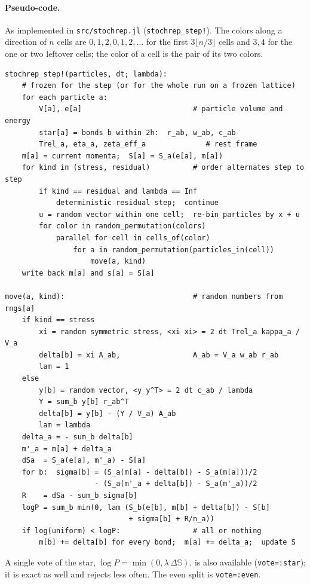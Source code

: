\documentclass[11pt,aps,preprint,nofootinbib,superscriptaddress,tightenlines]{revtex4-2}
\let\oldparagraph\paragraph
\renewcommand{\paragraph}{\par\bigskip\oldparagraph}
\begin{document}
\paragraph{Pseudo-code.}  As implemented in \texttt{src/stochrep.jl}
(\texttt{stochrep\_step!}).  The colors along a direction of $n$ cells are
$0,1,2,0,1,2,\dots$ for the first $3\lfloor n/3\rfloor$ cells and $3,4$ for the
one or two leftover cells; the color of a cell is the pair of its two colors.
\begin{verbatim}
stochrep_step!(particles, dt; lambda):
    # frozen for the step (or for the whole run on a frozen lattice)
    for each particle a:
        V[a], e[a]                          # particle volume and energy
        star[a] = bonds b within 2h:  r_ab, w_ab, c_ab
        Trel_a, eta_a, zeta_eff_a              # rest frame
    m[a] = current momenta;  S[a] = S_a(e[a], m[a])
    for kind in (stress, residual)          # order alternates step to step
        if kind == residual and lambda == Inf
            deterministic residual step;  continue
        u = random vector within one cell;  re-bin particles by x + u
        for color in random_permutation(colors)
            parallel for cell in cells_of(color)
                for a in random_permutation(particles_in(cell))
                    move(a, kind)
    write back m[a] and s[a] = S[a]

move(a, kind):                              # random numbers from rngs[a]
    if kind == stress
        xi = random symmetric stress, <xi xi> = 2 dt Trel_a kappa_a / V_a
        delta[b] = xi A_ab,                 A_ab = V_a w_ab r_ab
        lam = 1
    else
        y[b] = random vector, <y y^T> = 2 dt c_ab / lambda
        Y = sum_b y[b] r_ab^T
        delta[b] = y[b] - (Y / V_a) A_ab
        lam = lambda
    delta_a = - sum_b delta[b]
    m'_a = m[a] + delta_a
    dSa  = S_a(e[a], m'_a) - S[a]
    for b:  sigma[b] = (S_a(m[a] - delta[b]) - S_a(m[a]))/2
                     - (S_a(m'_a + delta[b]) - S_a(m'_a))/2
    R    = dSa - sum_b sigma[b]
    logP = sum_b min(0, lam (S_b(e[b], m[b] + delta[b]) - S[b]
                             + sigma[b] + R/n_a))
    if log(uniform) < logP:                 # all or nothing
        m[b] += delta[b] for every bond;  m[a] += delta_a;  update S
\end{verbatim}
A single vote of the star, $\log P=\min(0,\lambda\,\Delta\mathbb S)$, is also
available (\texttt{vote=:star}); it is exact as well and rejects less often.
The even split is \texttt{vote=:even}.

\end{document}
